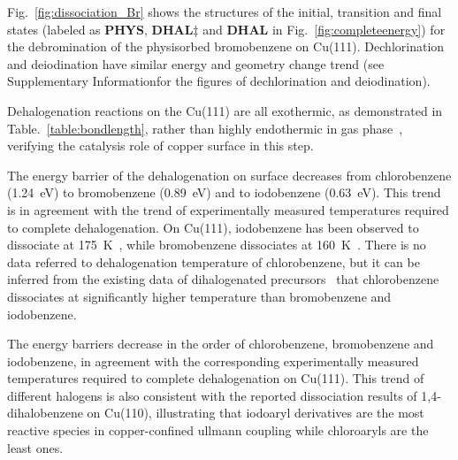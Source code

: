 \documentclass[%
 reprint,
 amsmath,amssymb,
 aps,
prb,
floatfix,
]{revtex4-2}
\newcommand{\lock}{\color{red}}
\newcommand{\lock}{\color{red}}
\newcommand{\sinfo}{Supplementary Information}
\begin{document}
{\lock

Fig.~\ref{fig:dissociation_Br} shows the structures of the initial, transition and final states (labeled as \textbf{PHYS}, \textbf{DHAL$\ddagger$} and \textbf{DHAL} in Fig.~\ref{fig:completeenergy}) for the debromination of the physisorbed bromobenzene on Cu(111). Dechlorination and deiodination have similar energy and geometry change trend (see \sinfo for the figures of dechlorination and deiodination).

}{\color{blue}





Dehalogenation reactions on the Cu(111) are all exothermic, as demonstrated in Table.~\ref{table:bondlength}, rather than highly endothermic in gas phase~\cite{jacs2013}, verifying the catalysis role of copper surface in this step.

{\lock
The energy barrier of the dehalogenation on surface decreases from chlorobenzene (\SI{1.24}{\electronvolt}) to bromobenzene (\SI{0.89}{\electronvolt}) and to iodobenzene (\SI{0.63}{\electronvolt}). This trend is in agreement with the trend of experimentally measured temperatures required to complete dehalogenation. On Cu(111), iodobenzene has been observed to dissociate at \SI{175}{\kelvin}~\cite{ullmann_87}, while bromobenzene dissociates at \SI{160}{\kelvin}~\cite{ullmann_67}. There is no data referred to dehalogenation temperature of chlorobenzene, but it can be inferred from the existing data of dihalogenated precursors~\cite{ullmann_52} that chlorobenzene dissociates at significantly higher temperature than bromobenzene and iodobenzene.
}

The energy barriers decrease in the order of chlorobenzene, bromobenzene and iodobenzene, in agreement with the corresponding experimentally measured temperatures required to complete dehalogenation on Cu(111). This trend of different halogens is also consistent with the reported dissociation results of 1,4-dihalobenzene on Cu(110)\cite{ullmann_52}, illustrating that iodoaryl derivatives are the most reactive species in copper-confined ullmann coupling while chloroaryls are the least ones. 

}
\end{document}
